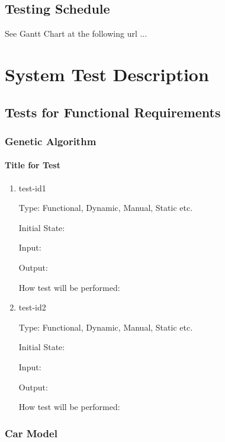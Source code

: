 \documentclass[12pt, titlepage]{article}
\begin{document}
\subsection{Testing Schedule}
		
See Gantt Chart at the following url ...

\section{System Test Description}
	
\subsection{Tests for Functional Requirements}

\subsubsection{Genetic Algorithm}
		
\paragraph{Title for Test}

\begin{enumerate}

\item{test-id1\\}

Type: Functional, Dynamic, Manual, Static etc.
					
Initial State: 
					
Input: 
					
Output: 
					
How test will be performed: 
					
\item{test-id2\\}

Type: Functional, Dynamic, Manual, Static etc.
					
Initial State: 
					
Input: 
					
Output: 
					
How test will be performed: 

\end{enumerate}

\subsubsection{Car Model}
\end{document}
